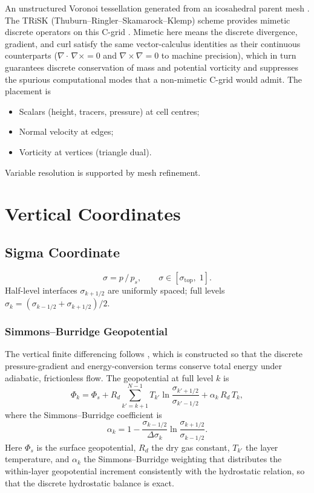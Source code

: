 \documentclass[11pt,twoside]{report}
\newcommand{\Rd}{R_d}
\newcommand{\grad}{\nabla}
\newcommand{\divg}{\nabla\!\cdot\!}
\begin{document}
An unstructured Voronoi tessellation generated from an icosahedral parent
mesh \citep{Skamarock2012}.  The TRiSK (Thuburn--Ringler--Skamarock--Klemp)
scheme provides mimetic discrete operators on this C-grid
\citep{Thuburn2009,Ringler2010}.  Mimetic here means the discrete divergence,
gradient, and curl satisfy the same vector-calculus identities as their
continuous counterparts ($\divg\,\grad\times=0$ and $\grad\times\grad=0$ to
machine precision), which in turn guarantees discrete conservation of mass and
potential vorticity and suppresses the spurious computational modes that a
non-mimetic C-grid would admit.  The placement is
\begin{itemize}[nosep]
  \item Scalars (height, tracers, pressure) at cell centres;
  \item Normal velocity at edges;
  \item Vorticity at vertices (triangle dual).
\end{itemize}
Variable resolution is supported by mesh refinement.


\section{Vertical Coordinates}
\label{sec:vertical}

\subsection{Sigma Coordinate}
\begin{equation}
  \sigma = p\,/\,p_s, \qquad \sigma\in[\sigma_{\mathrm{top}},\;1].
\end{equation}
Half-level interfaces $\sigma_{k+1/2}$ are uniformly spaced; full levels
$\sigma_k=(\sigma_{k-1/2}+\sigma_{k+1/2})/2$.

\subsubsection{Simmons--Burridge Geopotential}

The vertical finite differencing follows \citet{SimmonsBurridge1981}, which is
constructed so that the discrete pressure-gradient and energy-conversion terms
conserve total energy under adiabatic, frictionless flow.  The geopotential at
full level $k$ is
\begin{equation}
  \Phi_k = \Phi_s + \Rd\!\sum_{k'=k+1}^{N-1}T_{k'}\ln\frac{\sigma_{k'+1/2}}{\sigma_{k'-1/2}}
  + \alpha_k\,\Rd\,T_k,
\end{equation}
where the Simmons--Burridge coefficient is
\begin{equation}
  \alpha_k = 1 - \frac{\sigma_{k-1/2}}{\Delta\sigma_k}
  \ln\frac{\sigma_{k+1/2}}{\sigma_{k-1/2}}.
\end{equation}
Here $\Phi_s$ is the surface geopotential, $\Rd$ the dry gas constant, $T_{k'}$
the layer temperature, and $\alpha_k$ the Simmons--Burridge weighting that
distributes the within-layer geopotential increment consistently with the
hydrostatic relation, so that the discrete hydrostatic balance is exact.
\end{document}

